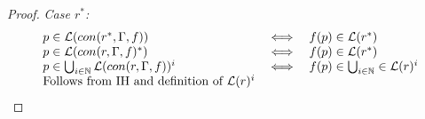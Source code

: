\documentclass[twocolumn, openany]{sig-alternate-10pt}
\newtheorem{defn}{Definition}
\newtheorem{lem}[thm]{Lemma}
\begin{document}
\begin{proof}
\emph{Case $r^*$:}
  \[ \begin{array}{lll}
    p \in \mathcal{L}(con(r^*,\Gamma,f)) &\iff& f(p) \in \mathcal{L}(r^*) \\
    p \in \mathcal{L}(con(r,\Gamma,f)^*) &\iff& f(p) \in \mathcal{L}(r^*) \\
    p \in \bigcup_{i \in \mathbb{N}} \mathcal{L}(con(r,\Gamma,f))^i &\iff& f(p) \in \bigcup_{i \in \mathbb{N}} \in \mathcal{L}(r)^i \\
    \text{Follows from IH and definition of } \mathcal{L}(r)^i & & \\
  \end{array} \]

\end{proof}






%





%
\end{document}
